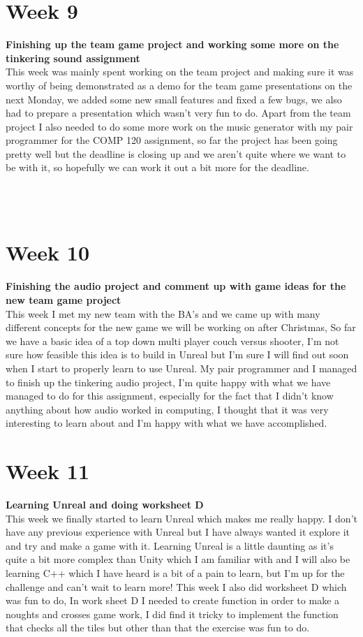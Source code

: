 \documentclass[11pt]{article}
\begin{document}
{\section*{Week 9}
{\small \textbf{Finishing up the team game project and working some more on the tinkering sound assignment}}\\
This week was mainly spent working on the team project and making sure it was worthy of being demonstrated as a demo for the team game presentations on the next Monday, we added some new small features and fixed a few bugs, we also had to prepare a presentation which wasn't very fun to do. Apart from the team project I also needed to do some more work on the music generator with my pair programmer for the COMP 120 assignment, so far the project has been going pretty well but the deadline is closing up and we aren't quite where we want to be with it, so hopefully we can work it out a bit more for the deadline.
}
\\~\\
{\section*{Week 10}
{\small \textbf{Finishing the audio project and comment up with game ideas for the new team game project}}\\
This week I met my new team with the BA's and we came up with many different concepts for the new game we will be working on after Christmas, So far we have a basic idea of a top down multi player couch versus shooter,  I'm not sure how feasible this idea is to build in Unreal but I'm sure I will find out soon when I start to properly learn to use Unreal. My pair programmer and I managed to finish up the tinkering audio project, I'm quite happy with what we have managed to do for this assignment, especially for the fact that I didn't know anything about how audio worked in computing, I thought that it was very interesting to learn about and I'm happy with what we have accomplished.
}

{\section*{Week 11}
{\small \textbf{Learning Unreal and doing worksheet D}}\\
This week we finally started to learn Unreal which makes me really happy. I don't have any previous experience with Unreal but I have always wanted it explore it and try and make a game with it. Learning Unreal is a little daunting as it's quite a bit more complex than Unity which I am familiar with and I will also be learning C++ which I have heard is a bit of a pain to learn, but I'm up for the challenge and can't wait to learn more! This week I also did worksheet D which was fun to do, In work sheet D I needed to create function in order to make a noughts and crosses game work, I did find it tricky to implement the function that checks all the tiles but other than that the exercise was fun to do.
}
\end{document}
